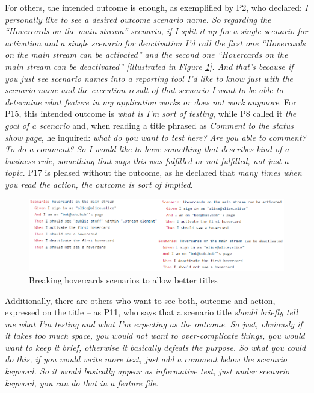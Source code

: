 For others, the intended outcome is enough, as exemplified by P2, who declared: \textit{I personally like to see a desired outcome scenario name. So regarding the ``Hovercards on the main stream'' scenario, if I split it up for a single scenario for activation and a single scenario for deactivation I'd call the first one ``Hovercards on the main stream can be activated'' and the second one ``Hovercards on the main stream can be deactivated'' [illustrated in Figure \ref{fig:breaking_scenarios_to_allow_better_titles}]. And that's because if you just see scenario names into a reporting tool I'd like to know just with the scenario name and the execution result of that scenario I want to be able to determine what feature in my application works or does not work anymore}. For P15, this intended outcome is \textit{what is I'm sort of testing}, while P8 called it \textit{the goal of a scenario} and, when reading a title phrased as \textit{Comment to the status show page}, he inquired: \textit{what do you want to test here? Are you able to comment? To do a comment? So I would like to have something that describes kind of a business rule, something that says this was fulfilled or not fulfilled, not just a topic}. P17 is pleased without the outcome, as he declared that \textit{many times when you read the action, the outcome is sort of implied}.

\begin{figure}[h]
	\centering
	\includegraphics[scale=0.8]{images/breaking_scenarios_to_allow_better_titles}
	\caption[\hspace{2mm}Breaking hovercards scenarios to allow better titles]{Breaking hovercards scenarios to allow better titles}
	\label{fig:breaking_scenarios_to_allow_better_titles}
\end{figure}

Additionally, there are others who want to see both, outcome and action, expressed on the title -- as P11, who says that a scenario title \textit{should briefly tell me what I'm testing and what I'm expecting as the outcome. So just, obviously if it takes too much space, you would not want to over-complicate things, you would want to keep it brief, otherwise it basically defeats the purpose. So what you could do this, if you would write more text, just add a comment below the scenario keyword. So it would basically appear as informative test, just under scenario keyword, you can do that in a feature file}.


